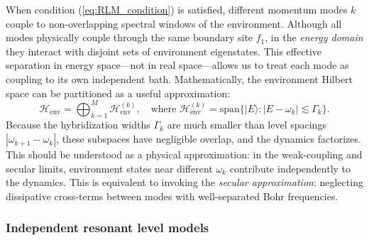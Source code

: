 \documentclass[12pt,oneside,openright]{report}
\theoremstyle{definition}
\theoremstyle{plain}
\theoremstyle{remark}
\begin{document}
When condition (\ref{eq:RLM_condition}) is satisfied, different momentum modes $k$ couple to 
non-overlapping spectral windows of the environment. Although all modes physically couple through 
the same boundary site $f_1$, in the \emph{energy domain} they interact with disjoint sets of 
environment eigenstates. This effective separation in energy space—not in real space—allows us to 
treat each mode as coupling to its own independent bath.
Mathematically, the environment Hilbert space can be partitioned as a useful approximation:
\begin{equation}
\mathcal{H}_{\text{env}} = \bigoplus_{k=1}^M \mathcal{H}_{\text{env}}^{(k)}, \quad \text{where } \mathcal{H}_{\text{env}}^{(k)} = \text{span}\{|E\rangle : |E - \omega_k| \lesssim \Gamma_k\}.
\end{equation}
Because the hybridization widths $\Gamma_k$ are much smaller than level spacings $|\omega_{k+1} - \omega_k|$, these subspaces have negligible overlap, and the dynamics factorizes. This should be understood as a physical approximation: in the weak-coupling and secular limits, environment states near different $\omega_k$ contribute independently to the dynamics. This is equivalent to invoking the \emph{secular approximation}: neglecting dissipative cross-terms between modes with well-separated Bohr frequencies.

\subsubsection{Independent resonant level models}
\end{document}

